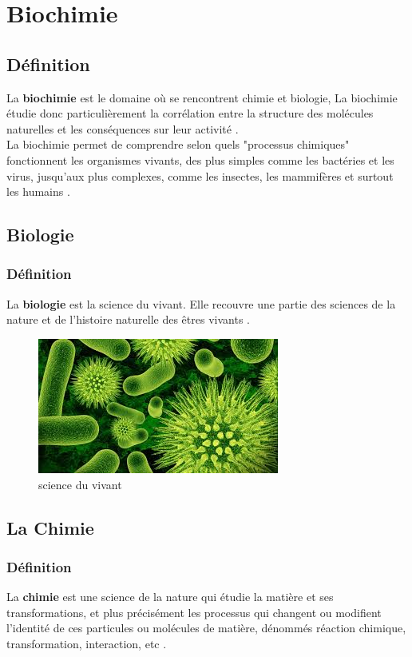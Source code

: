 \documentclass[12pt]{report}
\begin{document}
\section{Biochimie}
\subsection{Définition}
La \textbf{biochimie} est le domaine où se rencontrent chimie et biologie, La biochimie étudie donc particulièrement la corrélation entre la structure des molécules naturelles et les conséquences sur leur activité \cite{ref6} .\\
La biochimie permet de comprendre selon quels "processus chimiques" fonctionnent les organismes vivants, des plus simples comme les bactéries et les virus, jusqu'aux plus complexes, comme les insectes, les mammifères et surtout les humains  \cite{ref6}  .
\subsection{Biologie}
\subsubsection{Définition}
La \textbf{biologie} est la science du vivant. Elle recouvre une partie des sciences de la nature et de l'histoire naturelle des êtres vivants  \cite{ref6} .\\
\begin{figure}[h]
\begin{center}
\includegraphics[width=300]{bio.jpg}
\caption{science du vivant}
\end{center}

\end{figure}


\subsection{La Chimie}
\subsubsection{Définition}
La \textbf{chimie} est une science de la nature qui étudie la matière et ses transformations,  et plus précisément les processus qui changent ou modifient l'identité de ces particules ou molécules de matière, dénommés réaction chimique, transformation, interaction, etc  \cite{ref6} .
\end{document}
